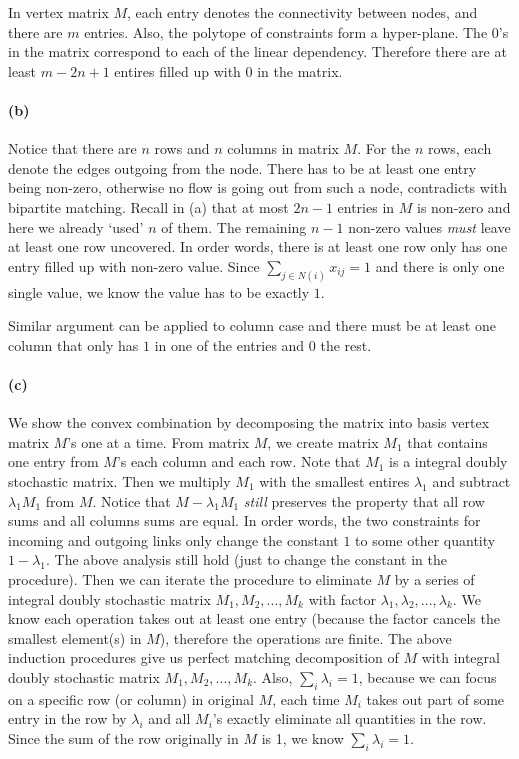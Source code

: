 \documentclass[12pt]{article}
\begin{document}
In vertex matrix $M$,  each entry denotes the connectivity between nodes, and there are $m$ entries. Also, the polytope of constraints form a hyper-plane. The $0$'s in the matrix correspond to each of the linear dependency. Therefore there are at least $m-2n+1$ entires filled up with $0$ in the matrix.

\paragraph{(b)} Notice that there are $n$ rows and $n$ columns in matrix $M$. For the $n$ rows, each denote the edges outgoing from the node. There has to be at least one entry being non-zero, otherwise no flow is going out from such a node, contradicts with bipartite matching. Recall in (a) that at most $2n-1$ entries in $M$ is non-zero and here we already `used' $n$ of them. The remaining $n-1$ non-zero values \emph{must} leave at least one row uncovered. In order words, there is at least one row only has one entry filled up with non-zero value. Since $\sum_{j\in N(i)}x_{ij} = 1$ and there is only one single value, we know the value has to be exactly $1$. 

Similar argument can be applied to column case and there must be at least one column that only has $1$ in one of the entries and $0$ the rest.  

\paragraph{(c)} We show the convex combination by decomposing the matrix into basis vertex matrix $M$'s one at a time. From matrix $M$, we create matrix $M_1$ that contains one entry from $M$'s each column and each row. Note that $M_1$ is a integral doubly stochastic matrix. Then we multiply $M_1$ with the smallest entires $\lambda_1$ and subtract $\lambda_1M_1$ from $M$. Notice that $M-\lambda_1M_1$ \emph{still} preserves the property that all row sums and all columns sums are equal. In order words, the two constraints for incoming and outgoing links only change the constant $1$ to some other quantity $1-\lambda_1$. The above analysis still hold (just to change the constant in the procedure). Then we can iterate the procedure to eliminate $M$ by a series of integral doubly stochastic matrix $M_1, M_2, ..., M_k$ with factor $\lambda_1, \lambda_2, ..., \lambda_k$. We know each operation takes out at least one entry (because the factor cancels the smallest element(s) in $M$), therefore the operations are finite. The above induction procedures give us perfect matching decomposition of $M$ with integral doubly stochastic matrix $M_1, M_2, ..., M_k$. Also, $\sum_i \lambda_i = 1$, because we can focus on a specific row (or column) in original $M$, each time $M_i$ takes out part of some entry in the row by $\lambda_i$ and all $M_i$'s exactly eliminate all quantities in the row. Since the sum of the row originally in $M$ is 1, we know $\sum_i \lambda_i = 1$.
\end{document}
